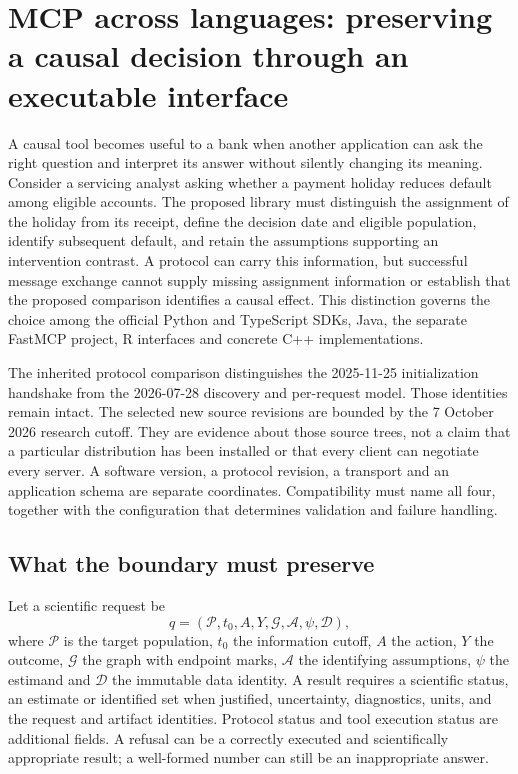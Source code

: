 \section{MCP across languages: preserving a causal decision through an executable interface}
\label{sec:exec24-mcp-reuse}

A causal tool becomes useful to a bank when another application can ask the
right question and interpret its answer without silently changing its meaning.
Consider a servicing analyst asking whether a payment holiday reduces default
among eligible accounts. The proposed library must distinguish the assignment
of the holiday from its receipt, define the decision date and eligible
population, identify subsequent default, and retain the assumptions supporting
an intervention contrast. A protocol can carry this information, but successful
message exchange cannot supply missing assignment information or establish that
the proposed comparison identifies a causal effect. This distinction governs
the choice among the official Python and TypeScript SDKs, Java, the separate
FastMCP project, R interfaces and concrete C++ implementations.
\citep{exec24_mcp_contracts}

The inherited protocol comparison distinguishes the 2025-11-25 initialization
handshake from the 2026-07-28 discovery and per-request model. Those identities
remain intact. The selected new source revisions are bounded by the 7 October
2026 research cutoff. They are evidence about those source trees, not a claim
that a particular distribution has been installed or that every client can
negotiate every server. A software version, a protocol revision, a transport
and an application schema are separate coordinates. Compatibility must name
all four, together with the configuration that determines validation and
failure handling.\citep{v12_mcp_legacy_lifecycle,v12_mcp_basic,
v12_mcp_versioning,exec24_mcp_contracts}

\subsection{What the boundary must preserve}

Let a scientific request be
\[
 q=(\mathcal P,t_0,A,Y,\mathcal G,\mathcal A,\psi,\mathcal D),
\]
where $\mathcal P$ is the target population, $t_0$ the information cutoff,
$A$ the action, $Y$ the outcome, $\mathcal G$ the graph with endpoint marks,
$\mathcal A$ the identifying assumptions, $\psi$ the estimand and $\mathcal D$
the immutable data identity. A result requires a scientific status, an
estimate or identified set when justified, uncertainty, diagnostics, units,
and the request and artifact identities. Protocol status and tool execution
status are additional fields. A refusal can be a correctly executed and
scientifically appropriate result; a well-formed number can still be an
inappropriate answer.\citep{exec24_mcp_contracts}

